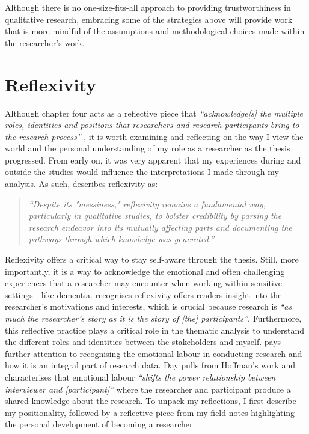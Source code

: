 Although there is no one-size-fits-all approach to providing trustworthiness in qualitative research, embracing some of the strategies above will provide work that is more mindful of the assumptions and methodological choices made within the researcher's work.  


\section{Reflexivity}
\label{Method:Reflectivity}
Although chapter four acts as a reflective piece that \textit{``acknowledge[s] the multiple roles, identities and positions that researchers and research participants bring to the research process''} \citep[pg.395]{milner2007race}, it is worth examining and reflecting on the way I view the world and the personal understanding of my role as a researcher as the thesis progressed. From early on, it was very apparent that my experiences during and outside the studies would influence the interpretations I made through my analysis. As such, \cite{probst2015eye} describes reflexivity as:
\begin{quote}
\textit{``Despite its "messiness," reflexivity remains a fundamental way, particularly in qualitative studies, to bolster credibility by parsing the research endeavor into its mutually affecting parts and documenting the pathways through which knowledge was generated.'' \citep{probst2015eye}
}\end{quote}

Reflexivity offers a critical way to stay self-aware through the thesis. Still, more importantly, it is a way to acknowledge the emotional and often challenging experiences that a researcher may encounter when working within sensitive settings - like dementia. \cite{corlett2018reflexivity} recognises reflexivity offers readers insight into the researcher's motivations and interests, which is crucial because research is \textit{``as much the researcher's story as it is the story of [the] participants''}. Furthermore, this reflective practice plays a critical role in the thematic analysis to understand the different roles and identities between the stakeholders and myself. \cite{day2012reflexive} pays further attention to recognising the emotional labour in conducting research and how it is an integral part of research data. Day pulls from Hoffman's work and characterises that emotional labour \textit{``shifts the power relationship between interviewer and [participant]''} where the researcher and participant produce a shared knowledge about the research. To unpack my reflections, I first describe my positionality, followed by a reflective piece from my field notes highlighting the personal development of becoming a researcher.

